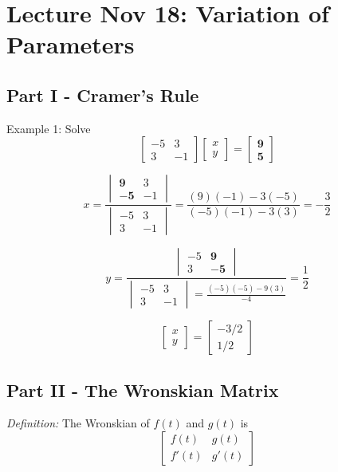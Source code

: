 \documentclass[12pt]{article}
\begin{document}
\section{Lecture Nov 18: Variation of Parameters}
\subsection*{Part I - Cramer's Rule}
Example 1: Solve 
\[\begin{bmatrix}
    -5 & 3\\
    3 & -1
\end{bmatrix} \begin{bmatrix}
    x\\y
\end{bmatrix} = \begin{bmatrix}
    \mathbf{9}\\\mathbf{5}
\end{bmatrix}\]

\[x = \frac{\begin{vmatrix}
    \mathbf{9} & 3\\
    \mathbf{-5} & -1
\end{vmatrix}}{\begin{vmatrix}
    -5 & 3\\
    3 & -1
\end{vmatrix}} = \frac{(9)(-1) - 3(-5)}{(-5)(-1) - 3(3)} = -\frac{3}{2}\]

\[y = \frac{\begin{vmatrix}
    -5 & \mathbf{9}\\
    3 & \mathbf{-5}
\end{vmatrix}}{\begin{vmatrix}
    -5 & 3\\
    3 & -1
\end{vmatrix} = \frac{(-5)(-5) - 9(3)}{-4}} = \frac{1}{2}\]

\[\begin{bmatrix}
    x\\y
\end{bmatrix} = \begin{bmatrix}
    -3/2\\
    1/2
\end{bmatrix}\]

\subsection*{Part II - The Wronskian Matrix}
\emph{Definition:} The Wronskian of $f(t)$ and $g(t)$ is 
\[\begin{bmatrix}
    f(t) & g(t)\\
    f'(t) & g'(t)
\end{bmatrix}\]
\end{document}
